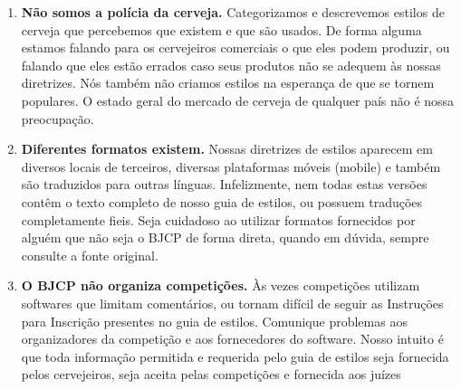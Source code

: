 \begin{enumerate}
\item \textbf{Não somos a polícia da cerveja.} Categorizamos e descrevemos estilos de cerveja que percebemos que existem e que são usados. De forma alguma estamos falando para os cervejeiros comerciais o que eles podem produzir, ou falando que eles estão errados caso seus produtos não se adequem às nossas diretrizes. Nós também não criamos estilos na esperança de que se tornem populares. O estado geral do mercado de cerveja de qualquer país não é nossa preocupação.
\item \textbf{Diferentes formatos existem.} Nossas diretrizes de estilos aparecem em diversos locais de terceiros, diversas plataformas móveis (mobile) e também são traduzidos para outras línguas. Infelizmente, nem todas estas versões contêm o texto completo de nosso guia de estilos, ou possuem traduções completamente fieis. Seja cuidadoso ao utilizar formatos fornecidos por alguém que não seja o BJCP de forma direta, quando em dúvida, sempre consulte a fonte original.
\item \textbf{O BJCP não organiza competições.} Às vezes competições utilizam softwares que limitam comentários, ou tornam difícil de seguir as Instruções para Inscrição presentes no guia de estilos. Comunique problemas aos organizadores da competição e aos fornecedores do software. Nosso intuito é que toda informação permitida e requerida pelo guia de estilos seja fornecida pelos cervejeiros, seja aceita pelas competições e fornecida aos juízes
\end{enumerate}